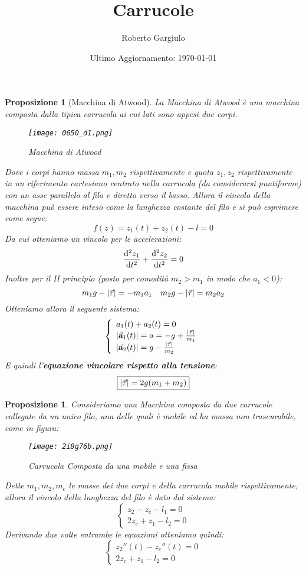 \documentclass{article}
\title{Carrucole}
\author{Roberto Gargiulo}
\date{Ultimo Aggiornamento: \today}
\newtheorem{prop}[defn]{Proposizione}
\renewcommand{\a}{\va{a}}
\begin{document}
\maketitle

\begin{prop}[Macchina di Atwood]
La Macchina di Atwood è una macchina composta dalla tipica carrucola ai cui lati sono appesi due corpi.

\begin{figure}[H]
    \centering
    \texttt{[image: 0650\_d1.png]}
    \caption{Macchina di Atwood}
    \label{atwoodmachine}
\end{figure}

Dove i corpi hanno massa $m_1,m_2$ rispettivamente e quota $z_1,z_2$ rispettivamente in un riferimento cartesiano centrato nella carrucola (da considerarsi puntiforme) con un asse parallelo al filo e diretto verso il basso. Allora il vincolo della macchina può essere inteso come la lunghezza costante del filo e si può esprimere come segue:
\[f(z)=z_1(t)+z_2(t)-l=0\]
Da cui otteniamo un vincolo per le accelerazioni:
\[\dv[2]{z_1}{t}+\dv[2]{z_2}{t}=0\]
Inoltre per il II principio (posto per comodità $m_2>m_1$ in modo che $a_1<0$):
\[m_1g-|\va{\tau}|=-m_1a_1\quad m_2g-|\va{\tau}|=m_2a_2\]
Otteniamo allora il seguente sistema:
\[\left\{\begin{array}{l}
    a_1(t)+a_2(t)=0  \\
    |\a_1(t)|=a=-g+\frac{|\va{\tau}|}{m_1}\\
    |\a_2(t)|=g-\frac{|\va{\tau}|}{m_2}
\end{array}\right.\]
E quindi l'\textbf{equazione vincolare rispetto alla tensione}:
\begin{equation}
    \boxed{|\va{\tau}|=2g(m_1+m_2)}
\end{equation}
\end{prop}

\begin{prop}
Consideriamo una Macchina composta da due carrucole collegate da un unico filo, una delle quali è mobile ed ha massa non trascurabile, come in figura: 
\begin{figure}[H]
    \centering
    \texttt{[image: 2i8g76b.png]}
    \caption{Carrucola Composta da una mobile e una fissa}
    \label{carrucolamobile}
\end{figure}

Dette $m_1,m_2,m_c$ le masse dei due corpi e della carrucola mobile rispettivamente, allora il vincolo della lunghezza del filo è dato dal sistema:
\[\left\{\begin{array}{l}
    z_2-z_c-l_1=0  \\
    2z_c+z_1-l_2=0 
\end{array}\right.\]
Derivando due volte entrambe le equazioni otteniamo quindi:
\[\left\{\begin{array}{l}
    z_2''(t)-z_c''(t)=0  \\
    2z_c+z_1-l_2=0 
\end{array}\right.\]
\end{prop}
\end{document}
